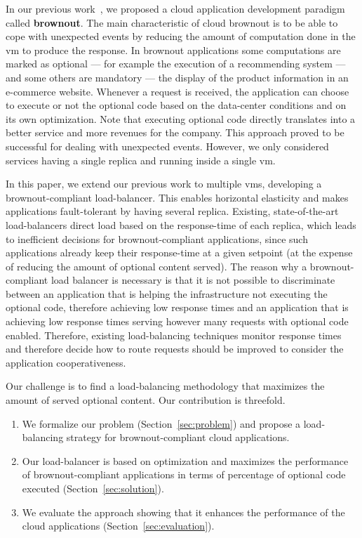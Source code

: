 In our previous work~\citep{cloudish-tr}, we proposed a cloud
application development paradigm called {\bf brownout}. The main
characteristic of cloud brownout is to be able to cope with unexpected
events by reducing the amount of computation done in the \ac{vm} to
produce the response. In brownout applications some computations are
marked as optional --- for example the execution of a recommending
system --- and some others are mandatory --- the display of the
product information in an e-commerce website. Whenever a request is
received, the application can choose to execute or not the optional
code based on the data-center conditions and on its own
optimization. Note that executing optional code directly translates
into a better service and more revenues for the company. This approach
proved to be successful for dealing with unexpected events. However,
we only considered services having a single replica and running inside
a single \ac{vm}.

In this paper, we extend our previous work to multiple \acp{vm},
developing a brownout-compliant load-balancer. This enables horizontal
elasticity and makes applications fault-tolerant by having several
replica. Existing, state-of-the-art load-balancers direct load based
on the response-time of each replica, which leads to inefficient
decisions for brownout-compliant applications, since such applications
already keep their response-time at a given setpoint (at the expense
of reducing the amount of optional content served). The reason why a
brownout-compliant load balancer is necessary is that it is not
possible to discriminate between an application that is helping the
infrastructure not executing the optional code, therefore achieving
low response times and an application that is achieving low response
times serving however many requests with optional code
enabled. Therefore, existing load-balancing techniques monitor
response times and therefore decide how to route requests should be
improved to consider the application cooperativeness.

Our challenge is to find a load-balancing methodology that maximizes
the amount of served optional content. Our contribution is threefold.
\begin{enumerate}
\item We formalize our problem (Section~\ref{sec:problem}) and propose
  a load-balancing strategy for brownout-compliant cloud applications.
\item Our load-balancer is based on optimization and maximizes the
  performance of brownout-compliant applications in terms of
  percentage of optional code executed (Section~\ref{sec:solution}).
\item We evaluate the approach showing that it enhances the
  performance of the cloud applications
  (Section~\ref{sec:evaluation}).
\end{enumerate}

